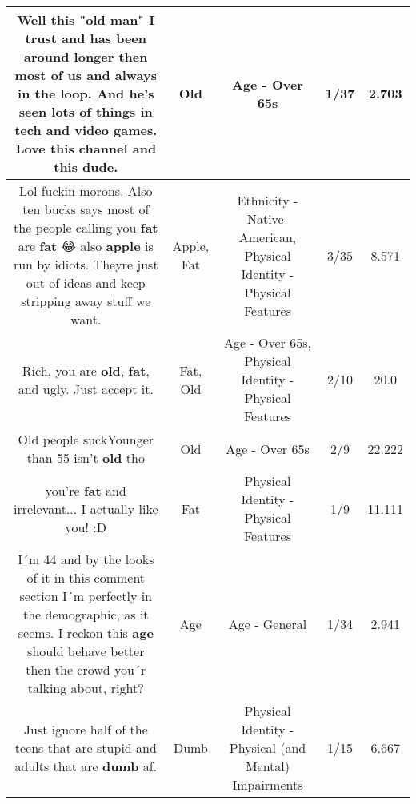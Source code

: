 \documentclass[11pt]{article}
\newlength\mylength
\begin{document}
\begin{center}
\begin{longtable}{|C{.65\mylength}|C{.30\mylength}|C{.12\mylength}|C{.12\mylength}|C{.12\mylength}|}
  \small Well this "\textbf{old} man" I trust and has been around longer then most of us and always in the loop. And he's seen lots of things in tech and video games. Love this channel and this dude.\normalsize   & Old & Age - Over 65s & 1/37 & 2.703 \\  \hline
  \small Lol fuckin morons. Also ten bucks says most of the people calling you \textbf{fat} are \textbf{fat} 😂 also \textbf{apple} is run by idiots. Theyre just out of ideas and keep stripping away stuff we want.\normalsize   & Apple, Fat & Ethnicity - Native-American, Physical Identity - Physical Features & 3/35 & 8.571 \\  \hline
  \small Rich, you are \textbf{old}, \textbf{fat}, and ugly. Just accept it.\normalsize   & Fat, Old & Age - Over 65s, Physical Identity - Physical Features & 2/10 & 20.0 \\  \hline
  \small Old people suckYounger than 55 isn't \textbf{old} tho\normalsize   & Old & Age - Over 65s & 2/9 & 22.222 \\  \hline
  \small you're \textbf{fat} and irrelevant... I actually like you! :D\normalsize   & Fat & Physical Identity - Physical Features & 1/9 & 11.111 \\  \hline
  \small I´m 44 and by the looks of it in this comment section I´m perfectly in the demographic, as it seems. I reckon this \textbf{age} should behave better then the crowd you´r talking about, right?\normalsize   & Age & Age - General & 1/34 & 2.941 \\  \hline
  \small Just ignore half of the teens that are stupid and adults that are \textbf{dumb} af.\normalsize   & Dumb & Physical Identity - Physical (and Mental) Impairments & 1/15 & 6.667 \\  \hline

\end{longtable}
\end{center}
\end{document}
